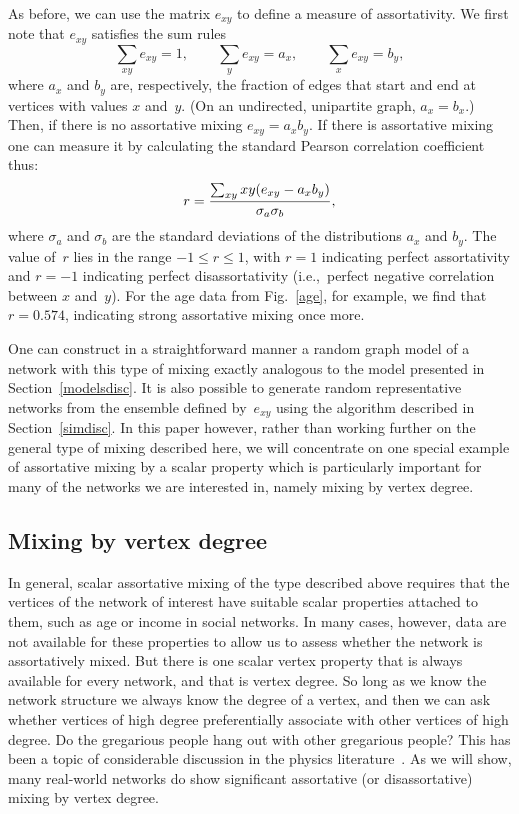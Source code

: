 \documentclass[twocolumn,pre]{revtex4}
\begin{document}
As before, we can use the matrix $e_{xy}$ to define a measure of
assortativity.  We first note that $e_{xy}$ satisfies the sum rules
\begin{equation}
\sum_{xy} e_{xy} = 1,\qquad \sum_y e_{xy} = a_x,\qquad \sum_x e_{xy} = b_y,
\label{sumrulesxy}
\end{equation}
where $a_x$ and $b_y$ are, respectively, the fraction of edges that start
and end at vertices with values $x$ and~$y$.  (On an undirected, unipartite
graph, $a_x=b_x$.)  Then, if there is no assortative mixing
$e_{xy}=a_xb_y$.  If there is assortative mixing one can measure it by
calculating the standard Pearson correlation coefficient thus:
\begin{equation}
r = {\sum_{xy} xy(e_{xy}-a_xb_y)\over\sigma_a\sigma_b},
\label{rscalar}
\end{equation}
where $\sigma_a$ and $\sigma_b$ are the standard deviations of the
distributions $a_x$ and $b_y$.  The value of~$r$ lies in the range $-1\le
r\le1$, with $r=1$ indicating perfect assortativity and $r=-1$ indicating
perfect disassortativity (i.e.,~perfect negative correlation between $x$
and~$y$).  For the age data from Fig.~\ref{age}, for example, we find that
$r=0.574$, indicating strong assortative mixing once more.

One can construct in a straightforward manner a random graph model of a
network with this type of mixing exactly analogous to the model presented
in Section~\ref{modelsdisc}.  It is also possible to generate random
representative networks from the ensemble defined by~$e_{xy}$ using the
algorithm described in Section~\ref{simdisc}.  In this paper however,
rather than working further on the general type of mixing described here,
we will concentrate on one special example of assortative mixing by a
scalar property which is particularly important for many of the networks we
are interested in, namely mixing by vertex degree.


\subsection{Mixing by vertex degree}
\label{bydegree}
In general, scalar assortative mixing of the type described above requires
that the vertices of the network of interest have suitable scalar
properties attached to them, such as age or income in social networks.  In
many cases, however, data are not available for these properties to allow
us to assess whether the network is assortatively mixed.  But there is one
scalar vertex property that is always available for every network, and that
is vertex degree.  So long as we know the network structure we always know
the degree of a vertex, and then we can ask whether vertices of high degree
preferentially associate with other vertices of high degree.  Do the
gregarious people hang out with other gregarious people?  This has been a
topic of considerable discussion in the physics
literature~\cite{PVV01,MS02b,DMS02,VW02,BPV02}.  As we will show, many
real-world networks do show significant assortative (or disassortative)
mixing by vertex degree.
\end{document}
